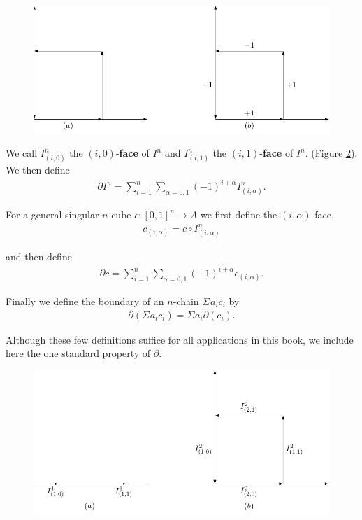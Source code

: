 \begin{figure}[!htb]
    \centering
    \includegraphics[width=.75\linewidth]{./pics/Fig4-4.pdf}
    \caption{}
    \label{Fig 4-4}
\end{figure}

We call $I^n_{(i,0)}$ the $(i,0)$-\textbf{face} of $I^n$ and $I^n_{(i,1)}$ the $(i,1)$-\textbf{face} of $I^n$.
(Figure \ref{Fig 4-5}). We then define 
\begin{align*}
    \partial I^n = \sum_{i=1}^n \sum_{\alpha=0,1}(-1)^{i+\alpha}I^n_{(i,\alpha)}.
\end{align*}

For a general singular $n$-cube $c:[0,1]^n\to A$ we first define the $(i,\alpha)$-face,
\begin{align*}
    c_{(i,\alpha)} = c\circ I^n_{(i,\alpha)}
\end{align*}

and then define 
\begin{align*}
  \partial c = \sum_{i=1}^n \sum_{\alpha=0,1}(-1)^{i+\alpha}c_{(i,\alpha)}.
\end{align*}

Finally we define the boundary of an $n$-chain $\Sigma_{}^{}{a_ic_i}$ by 
\begin{align*}
  \partial (\Sigma_{}^{}{a_ic_i}) = \Sigma_{}^{}{a_i\partial (c_i)}.
\end{align*}

Although these few definitions suffice for all applications in
this book, we include here the one standard property of $\partial$.

\begin{figure}[!htb]
    \centering
    \includegraphics[width=.75\linewidth]{./pics/Fig4-5.pdf}
    \caption{}
    \label{Fig 4-5}
\end{figure}

